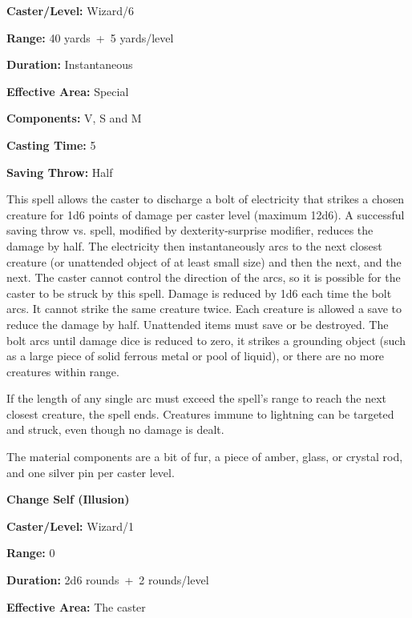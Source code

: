 \begin{multicols}{2}
\begin{minipage}{\columnwidth}
\noindent \textbf{Caster/Level:} Wizard/6

\noindent \textbf{Range:} 40 yards~+~5 yards/level

\noindent \textbf{Duration:} Instantaneous 

\noindent \textbf{Effective Area:} Special

\noindent \textbf{Components:} V, S and M

\noindent \textbf{Casting Time:} 5

\noindent \textbf{Saving Throw:} Half

\end{minipage}

This spell allows the caster to discharge a bolt of electricity that strikes a chosen creature for 1d6 points of damage per caster level (maximum 12d6).  A successful saving throw vs. spell, modified by dexterity-surprise modifier, reduces the damage by half.  The electricity then instantaneously arcs to the next closest creature (or unattended object of at least small size) and then the next, and the next. The caster cannot control the direction of the arcs, so it is possible for the caster to be struck by this spell.  Damage is reduced by 1d6 each time the bolt arcs.  It cannot strike the same creature twice.  Each creature is allowed a save to reduce the damage by half.  Unattended items must save or be destroyed.  The bolt arcs until damage dice is reduced to zero, it strikes a grounding object (such as a large piece of solid ferrous metal or pool of liquid), or there are no more creatures within range.  

If the length of any single arc must exceed the spell's range to reach the next closest creature, the spell ends.  Creatures immune to lightning can be targeted and struck, even though no damage is dealt.

The material components are a bit of fur, a piece of amber, glass, or crystal rod, and one silver pin per caster level.

\vspace{1em}

\noindent
\begin{minipage}{\columnwidth}

\noindent \textbf{Change Self (Illusion)}

\noindent \textbf{Caster/Level:} Wizard/1

\noindent \textbf{Range:} 0

\noindent \textbf{Duration:} 2d6 rounds~+~2 rounds/level 

\noindent \textbf{Effective Area:} The caster


\end{minipage}
\end{multicols}
